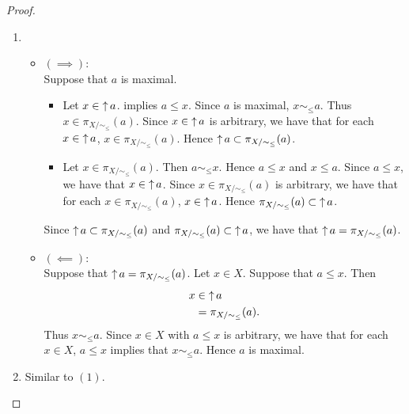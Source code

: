 \documentclass{book}
\begin{document}
	\begin{proof}\
		\begin{enumerate}
			\item 
			\begin{itemize}
				\item $(\implies)$: \\
				Suppose that $a$ is maximal. 
				\begin{itemize}
					\item Let $x \in \operatorname{\uparrow} a$.  implies $a \leq x$. Since $a$ is maximal, $x \sim_{\leq} a$. Thus $x \in \pi_{X/\sim_{\leq}}(a)$. Since $x \in \operatorname{\uparrow} a$ is arbitrary, we have that for each $x \in \operatorname{\uparrow} a$, $x \in \pi_{X/\sim_{\leq}}(a)$. Hence $\operatorname{\uparrow} a \subset \pi_{X/\sim_{\leq}}(a)$.
					\item Let $x \in \pi_{X/\sim_{\leq}}(a)$. Then $a \sim_{\leq} x$. Hence $a \leq x$ and $x \leq a$. Since $a \leq x$, we have that $x \in \operatorname{\uparrow} a$. Since $x \in \pi_{X/\sim_{\leq}}(a)$ is arbitrary, we have that for each $x \in \pi_{X/\sim_{\leq}}(a)$, $x \in \operatorname{\uparrow} a$. Hence $\pi_{X/\sim_{\leq}}(a) \subset \operatorname{\uparrow} a$.
				\end{itemize}
				Since $\operatorname{\uparrow} a \subset \pi_{X/\sim_{\leq}}(a)$ and $\pi_{X/\sim_{\leq}}(a) \subset \operatorname{\uparrow} a$, we have that $\operatorname{\uparrow} a = \pi_{X/\sim_{\leq}}(a)$.
				\item $(\impliedby)$: \\
				Suppose that $\operatorname{\uparrow} a = \pi_{X/\sim_{\leq}}(a)$. Let $x \in X$. Suppose that $a \leq x$. Then 
				\begin{align*}
					x 
					& \in \operatorname{\uparrow} a \\
					& = \pi_{X/\sim_{\leq}}(a).
				\end{align*}
				Thus $x \sim_{\leq} a$. Since $x \in X$ with $a \leq x$ is arbitrary, we have that for each $x \in X$, $a \leq x$ implies that $x \sim_{\leq} a$. Hence $a$ is maximal.
			\end{itemize}
			\item Similar to $(1)$.
		\end{enumerate}
	\end{proof}
	
\end{document}

